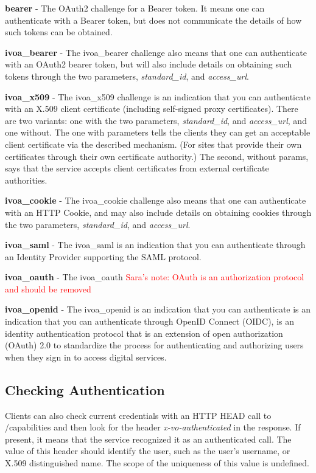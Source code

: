\documentclass[11pt,a4paper]{ivoa}
\begin{document}
\textbf{bearer} - The OAuth2 \citep{std:RFC6749} challenge for a Bearer
token. It means one can authenticate with a Bearer token, but does not
communicate the details of how such tokens can be obtained.

\textbf{ivoa\_bearer} - The ivoa\_bearer challenge also means that one
can authenticate with an OAuth2 bearer token, but will also include
details on obtaining such tokens through the two parameters,
\emph{standard\_id}, and \emph{access\_url}.

\textbf{ivoa\_x509} - The ivoa\_x509 challenge is an indication that you
can authenticate with an X.509 client certificate (including self-signed
proxy certificates). There are two variants: one with the two
parameters, \emph{standard\_id}, and \emph{access\_url}, and one
without. The
one with parameters tells the clients they can get an acceptable client
certificate via the described mechanism. (For sites that provide their own
certificates through their own certificate authority.) The second,
without params, says that the service accepts client certificates from
external certificate authorities.

\textbf{ivoa\_cookie} - The ivoa\_cookie challenge also means that one can
authenticate with an HTTP Cookie, and may also include details on
obtaining cookies through the two parameters, \emph{standard\_id}, and
\emph{access\_url}.

\textbf{ivoa\_saml} - The ivoa\_saml is an indication that you
can authenticate through an Identity Provider supporting the SAML
protocol.


\textbf{ivoa\_oauth} - The ivoa\_oauth \textcolor{red}{Sara's note:
OAuth is an authorization protocol and should be removed}

\textbf{ivoa\_openid} - The ivoa\_openid is an indication that you
can authenticate is an indication that you
can authenticate through OpenID Connect (OIDC), is an identity
authentication protocol that is an extension of open authorization
(OAuth) 2.0 to standardize the process for authenticating and authorizing
users when they sign in to access digital services.

\subsection{Checking Authentication}

Clients can also check current credentials with an HTTP HEAD call to
/capabilities and then look for the header \emph{x-vo-authenticated} in
the response. If present, it means that the service recognized it as an
authenticated call.  The value of this header should identify the user,
such as the user's username, or X.509 distinguished name.  The scope of
the uniqueness of this value is undefined.
\end{document}
